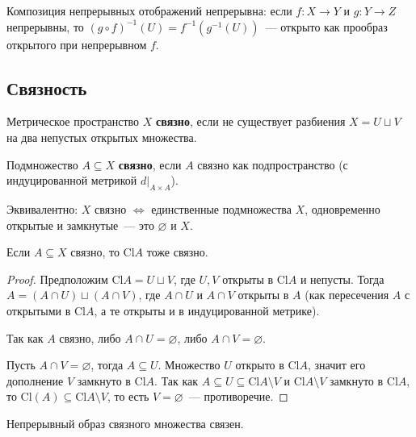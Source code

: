 \documentclass[12pt]{article}
\newcommand{\Cl}{\text{Cl}}
\begin{document}
	\begin{note}
		Композиция непрерывных отображений непрерывна: если $f: X \to Y$ и $g: Y \to Z$ непрерывны, то $(g \circ f)^{-1}(U) = f^{-1}(g^{-1}(U))$~--- открыто как прообраз открытого при непрерывном $f$.
	\end{note}
	
	\subsection{Связность}
	
	\begin{definition}
		Метрическое пространство $X$ \textbf{связно}, если не существует разбиения $X = U \sqcup V$ на два непустых открытых множества.
		
		Подмножество $A \subseteq X$ \textbf{связно}, если $A$ связно как подпространство (с индуцированной метрикой $d|_{A \times A}$).
	\end{definition}
	
	\begin{note}
		Эквивалентно: $X$ связно $\Leftrightarrow$ единственные подмножества $X$, одновременно открытые и замкнутые~--- это $\varnothing$ и $X$.
	\end{note}
	
	\begin{theorem}
		Если $A \subseteq X$ связно, то $\Cl A$ тоже связно.
	\end{theorem}
	
	\begin{proof}
		Предположим $\Cl A = U \sqcup V$, где $U, V$ открыты в $\Cl A$ и непусты. Тогда $A = (A \cap U) \sqcup (A \cap V)$, где $A \cap U$ и $A \cap V$ открыты в $A$ (как пересечения $A$ с открытыми в $\Cl A$, а те открыты и в индуцированной метрике).
		
		Так как $A$ связно, либо $A \cap U = \varnothing$, либо $A \cap V = \varnothing$.
		
		Пусть $A \cap V = \varnothing$, тогда $A \subseteq U$. Множество $U$ открыто в $\Cl A$, значит его дополнение $V$ замкнуто в $\Cl A$. Так как $A \subseteq U \subseteq \Cl A \setminus V$ и $\Cl A \setminus V$ замкнуто в $\Cl A$, то $\Cl(A) \subseteq \Cl A \setminus V$, то есть $V = \varnothing$~--- противоречие.
	\end{proof}
	
	\begin{theorem}
		Непрерывный образ связного множества связен.
	\end{theorem}
	
\end{document}
